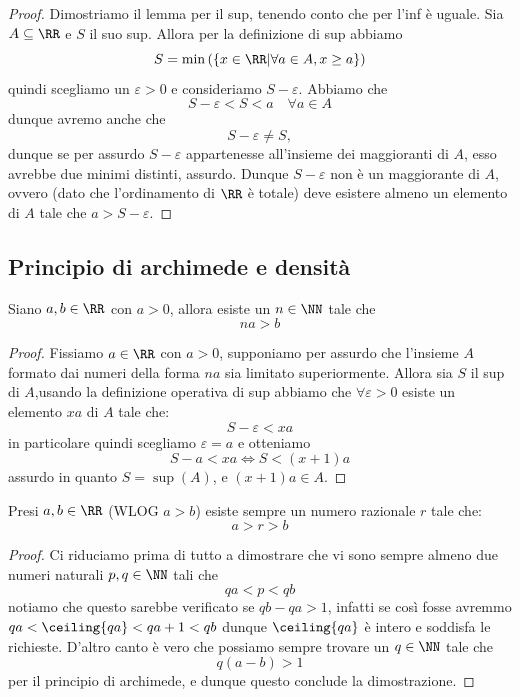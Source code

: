 \documentclass[11pt]{scrartcl}
\begin{document}
	\begin{proof}
		Dimostriamo il lemma per il sup, tenendo conto che per l'inf è uguale. Sia $A\subseteq\RR$ e $S$ il suo sup. Allora per la definizione di sup abbiamo
		$$S=\min\left(\left\{x\in\RR|\forall a\in A, x\ge a\right\}\right)$$
		quindi scegliamo un $\varepsilon>0$ e consideriamo $S-\varepsilon$. Abbiamo che 
		$$S-\varepsilon<S<a \quad \forall a\in A$$
		dunque avremo anche che 
		$$S-\varepsilon\ne S,$$
		dunque se per assurdo $S-\varepsilon$ appartenesse all'insieme dei maggioranti di $A$, esso avrebbe due minimi distinti, assurdo. Dunque $S-\varepsilon$ non è un maggiorante di $A$, ovvero (dato che l'ordinamento di $\RR$ è totale) deve esistere almeno un elemento di $A$ tale che $a>S-\varepsilon$.
	\end{proof}
	
	\subsection{Principio di archimede e densità}
	
	
	
	\begin{theorem}
		Siano $a,b\in\RR$ con $a>0$, allora esiste un $n\in\NN$ tale che
		$$na>b$$ 
	\end{theorem}
	\begin{proof}
		Fissiamo $a\in\RR$ con $a>0$, supponiamo per assurdo che l'insieme $A$ formato dai numeri della forma $na$ sia limitato superiormente. Allora sia $S$ il sup di $A$,usando la definizione operativa di sup abbiamo che $\forall\varepsilon>0$ esiste un elemento $xa$ di $A$ tale che:
		$$S-\varepsilon<xa$$
		in particolare quindi scegliamo $\varepsilon=a$ e otteniamo 
		$$S-a<xa \iff S<(x+1)a$$
		assurdo in quanto $S=\sup(A)$, e $(x+1)a\in A$.
	\end{proof} 
	\begin{theorem}[Densità di $\QQ$ in $\RR$]
		Presi $a,b\in\RR$ (WLOG $a>b$) esiste sempre un numero razionale $r$ tale che:
		$$a>r>b$$
	\end{theorem}
	\begin{proof}
		Ci riduciamo prima di tutto a dimostrare che vi sono sempre almeno due numeri naturali $p,q\in\NN$ tali che
		$$qa<p<qb$$
		notiamo che questo sarebbe verificato se $qb-qa>1$, infatti se così fosse avremmo $qa<\ceiling{qa}<qa+1<qb$ dunque $\ceiling{qa}$ è intero e soddisfa le richieste. D'altro canto è vero che possiamo sempre trovare un $q\in\NN$ tale che
		$$q(a-b)>1$$
		per il principio di archimede, e dunque questo conclude la dimostrazione.
	\end{proof}
	
\end{document}
